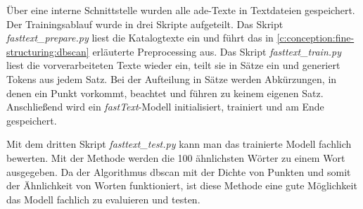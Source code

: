 Über eine interne Schnittstelle wurden alle \ac{ade}-Texte in Textdateien gespeichert. Der Trainingsablauf wurde in drei Skripte aufgeteilt. Das Skript \textit{fasttext\_prepare.py} liest die Katalogtexte ein und führt das in \autoref{c:conception:fine-structuring:dbscan} erläuterte Preprocessing aus.
Das Skript \textit{fasttext\_train.py} liest die vorverarbeiteten Texte wieder ein, teilt sie in Sätze ein und generiert Tokens aus jedem Satz. Bei der Aufteilung in Sätze werden Abkürzungen, in denen ein Punkt vorkommt, beachtet und führen zu keinem eigenen Satz. Anschließend wird ein \textit{fastText}-Modell initialisiert, trainiert und am Ende gespeichert.

Mit dem dritten Skript \textit{fasttext\_test.py} kann man das trainierte Modell fachlich bewerten. Mit der Methode  werden die 100 ähnlichsten Wörter zu einem Wort ausgegeben. Da der Algorithmus \ac{dbscan} mit der Dichte von Punkten und somit der \glqq Ähnlichkeit\grqq{} von Worten funktioniert, ist diese Methode eine gute Möglichkeit das Modell fachlich zu evaluieren und testen.

